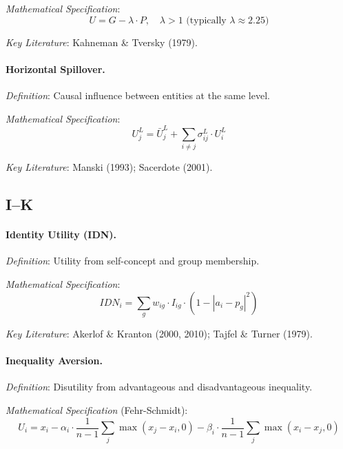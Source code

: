 \textit{Mathematical Specification}:
\begin{equation}
U = G - \lambda \cdot P, \quad \lambda > 1 \text{ (typically } \lambda \approx 2.25\text{)}
\end{equation}

\textit{Key Literature}: Kahneman \& Tversky (1979).

\medskip

\paragraph{Horizontal Spillover.}
\textit{Definition}: Causal influence between entities at the same level.

\textit{Mathematical Specification}:
\begin{equation}
U^L_j = \bar{U}^L_j + \sum_{i \neq j} \sigma^L_{ij} \cdot U^L_i
\end{equation}

\textit{Key Literature}: Manski (1993); Sacerdote (2001).

\subsection*{I--K}

\paragraph{Identity Utility (IDN).}
\textit{Definition}: Utility from self-concept and group membership.

\textit{Mathematical Specification}:
\begin{equation}
IDN_i = \sum_g w_{ig} \cdot I_{ig} \cdot (1 - |a_i - p_g|^2)
\end{equation}

\textit{Key Literature}: Akerlof \& Kranton (2000, 2010); Tajfel \& Turner (1979).

\medskip

\paragraph{Inequality Aversion.}
\textit{Definition}: Disutility from advantageous and disadvantageous inequality.

\textit{Mathematical Specification} (Fehr-Schmidt):
\begin{equation}
U_i = x_i - \alpha_i \cdot \frac{1}{n-1} \sum_{j} \max(x_j - x_i, 0) 
- \beta_i \cdot \frac{1}{n-1} \sum_{j} \max(x_i - x_j, 0)
\end{equation}

